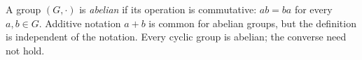 
A group $(G,\cdot)$ is \emph{abelian} if its operation is commutative: $ab=ba$ for every $a,b\in G$. Additive notation $a+b$ is common for abelian groups, but the definition is independent of the notation. Every cyclic group is abelian; the converse need not hold.
